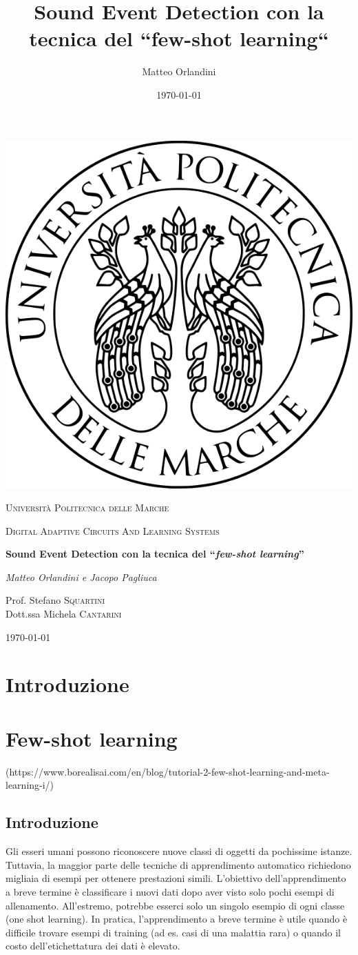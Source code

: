 \documentclass[12pt,a4paper,titlepage]{article}
\title{Sound Event Detection con la tecnica del “few-shot learning“}
\author{Matteo Orlandini}
\date{\today}
\begin{document}
\begin{titlepage}
	
	\centering
	\includegraphics[width=.2\textwidth]{Immagini/univpmlogo}\par\vspace{1cm}
	{\scshape\LARGE Università Politecnica delle Marche\par}
	\vspace{1cm}
	{\scshape\Large Digital Adaptive Circuits And Learning Systems\par}
	\vspace{1.5cm}
	{\huge\bfseries Sound Event Detection con la tecnica del  ``\emph{few-shot learning}''  \par}
	\vspace{2cm}
	{\Large\itshape Matteo Orlandini e Jacopo Pagliuca\par}
	\vfill
	Prof. Stefano \textsc{Squartini}\\
	Dott.ssa Michela \textsc{Cantarini}
	
	\vfill
	
	{\large \today\par}
\end{titlepage}

\thispagestyle{empty}
\tableofcontents
\clearpage

\setcounter{page}{1}

\section{Introduzione}
\label{section:Introduzione}
\clearpage

\section{Few-shot learning}
\label{section:Few-shot}
(https://www.borealisai.com/en/blog/tutorial-2-few-shot-learning-and-meta-learning-i/)
\subsection{Introduzione}
Gli esseri umani possono riconoscere nuove classi di oggetti da pochissime istanze. Tuttavia, la maggior parte delle tecniche di apprendimento automatico richiedono migliaia di esempi per ottenere prestazioni simili. L'obiettivo dell'apprendimento a breve termine è classificare i nuovi dati dopo aver visto solo pochi esempi di allenamento. All'estremo, potrebbe esserci solo un singolo esempio di ogni classe (one shot learning). In pratica, l'apprendimento a breve termine è utile quando è difficile trovare esempi di training (ad es. casi di una malattia rara) o quando il costo dell'etichettatura dei dati è elevato.
\end{document}
